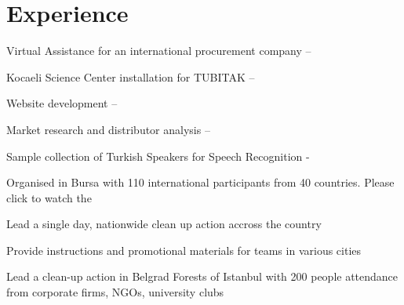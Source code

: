 \documentclass[]{deedy-resume-openfont}
\begin{document}
\hfill
\begin{minipage}[t]{0.66\textwidth}


\section{Experience}

\href{http://www.upwork.com/}{}
\vspace{\topsep} %
\begin{tightemize}
\item Virtual Assistance for an international procurement company -- 
\item Kocaeli Science Center installation for TUBITAK --  
\item Website development -- 
\item Market research and distributor analysis -- 
\item Sample collection of Turkish Speakers for Speech Recognition -  
\end{tightemize}
\sectionsep

\href{http://letsdoitturkiye.org.tr/}{}
\begin{tightemize}
\item Organised  in Bursa with 110 international participants from 40 countries. Please click to watch the 
\item Lead a single day, nationwide clean up action accross the country
\item Provide instructions and promotional materials for teams in various cities
\item Lead a clean-up action in Belgrad Forests of Istanbul with 200 people attendance from corporate firms, NGOs, university clubs
\end{tightemize}
\sectionsep


\end{minipage}
\end{document}
